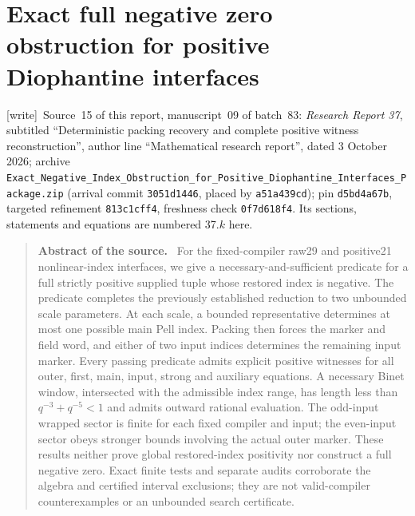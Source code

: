 \documentclass[11pt,letterpaper]{article}
\theoremstyle{definition}\newtheorem{definition}[theorem]{Definition}
\theoremstyle{remark}\newtheorem{remark}[theorem]{Remark}
\newcommand{\wtag}{\textup{[write]}}
\newenvironment{sourceabstract}{\par\begin{quote}\small\textbf{Abstract of the source.}\ }{\end{quote}}
\newcommand{\rw}[1]{\nolinkurl{#1}}%
\begin{document}
\part{Exact full negative zero obstruction for positive Diophantine interfaces}\label{fup:part:nz}
\noindent\wtag\ Source~15 of this report, manuscript~09 of batch~83: \emph{Research Report 37}, subtitled ``Deterministic packing recovery and complete positive witness reconstruction'', author line ``Mathematical research report'', dated 3 October 2026; archive \rw{Exact_Negative_Index_Obstruction_for_Positive_Diophantine_Interfaces_Package.zip} (arrival commit \texttt{3051d1446}, placed by \texttt{a51a439cd}); pin \texttt{d5bd4a67b}, targeted refinement \texttt{813c1cff4}, freshness check \texttt{0f7d618f4}. Its sections, statements and equations are numbered 37.$k$ here.
\begin{sourceabstract}
For the fixed-compiler raw29 and positive21 nonlinear-index interfaces, we give a necessary-and-sufficient predicate for a full strictly positive supplied tuple whose restored index is negative. The predicate completes the previously established reduction to two unbounded scale parameters. At each scale, a bounded representative determines at most one possible main Pell index. Packing then forces the marker and field word, and either of two input indices determines the remaining input marker. Every passing predicate admits explicit positive witnesses for all outer, first, main, input, strong and auxiliary equations. A necessary Binet window, intersected with the admissible index range, has length less than $q^{-3}+q^{-5}<1$ and admits outward rational evaluation. The odd-input wrapped sector is finite for each fixed compiler and input; the even-input sector obeys stronger bounds involving the actual outer marker. These results neither prove global restored-index positivity nor construct a full negative zero. Exact finite tests and separate audits corroborate the algebra and certified interval exclusions; they are not valid-compiler counterexamples or an unbounded search certificate.
\end{sourceabstract}
\end{document}
